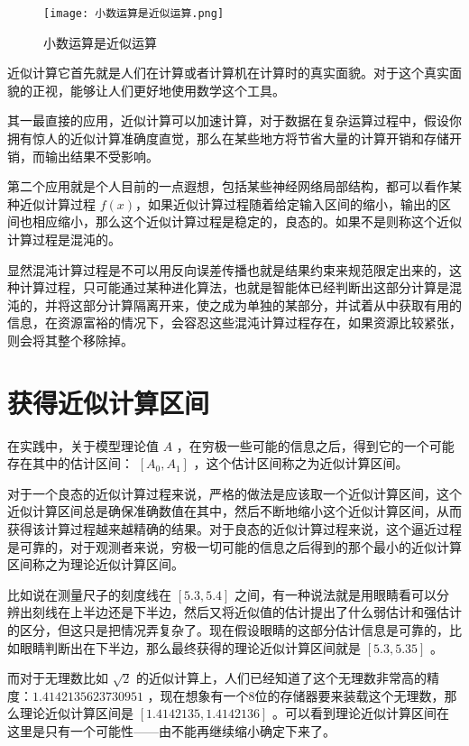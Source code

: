 \documentclass[12pt,oneside]{book}
\begin{document}
\begin{figure}[H]
\centering
\texttt{[image: 小数运算是近似运算.png]}
\caption{小数运算是近似运算}
\end{figure}

近似计算它首先就是人们在计算或者计算机在计算时的真实面貌。对于这个真实面貌的正视，能够让人们更好地使用数学这个工具。

其一最直接的应用，近似计算可以加速计算，对于数据在复杂运算过程中，假设你拥有惊人的近似计算准确度直觉，那么在某些地方将节省大量的计算开销和存储开销，而输出结果不受影响。

第二个应用就是个人目前的一点遐想，包括某些神经网络局部结构，都可以看作某种近似计算过程 $f(x)$，如果近似计算过程随着给定输入区间的缩小，输出的区间也相应缩小，那么这个近似计算过程是稳定的，良态的。如果不是则称这个近似计算过程是混沌的。

显然混沌计算过程是不可以用反向误差传播也就是结果约束来规范限定出来的，这种计算过程，只可能通过某种进化算法，也就是智能体已经判断出这部分计算是混沌的，并将这部分计算隔离开来，使之成为单独的某部分，并试着从中获取有用的信息，在资源富裕的情况下，会容忍这些混沌计算过程存在，如果资源比较紧张，则会将其整个移除掉。



\section{获得近似计算区间}
在实践中，关于模型理论值 $A$ ，在穷极一些可能的信息之后，得到它的一个可能存在其中的估计区间： $[A_0, A_1]$ ，这个估计区间称之为近似计算区间。

对于一个良态的近似计算过程来说，严格的做法是应该取一个近似计算区间，这个近似计算区间总是确保准确数值在其中，然后不断地缩小这个近似计算区间，从而获得该计算过程越来越精确的结果。对于良态的近似计算过程来说，这个逼近过程是可靠的，对于观测者来说，穷极一切可能的信息之后得到的那个最小的近似计算区间称之为理论近似计算区间。

比如说在测量尺子的刻度线在 $[5.3, 5.4]$ 之间，有一种说法就是用眼睛看可以分辨出刻线在上半边还是下半边，然后又将近似值的估计提出了什么弱估计和强估计的区分，但这只是把情况弄复杂了。现在假设眼睛的这部分估计信息是可靠的，比如眼睛判断出在下半边，那么最终获得的理论近似计算区间就是 $[5.3, 5.35]$ 。

而对于无理数比如 $\sqrt{2}$ 的近似计算上，人们已经知道了这个无理数非常高的精度：$ 1.4142135623730951 $ ，现在想象有一个8位的存储器要来装载这个无理数，那么理论近似计算区间是 $ [1.4142135, 1.4142136] $ 。可以看到理论近似计算区间在这里是只有一个可能性——由不能再继续缩小确定下来了。
\end{document}
